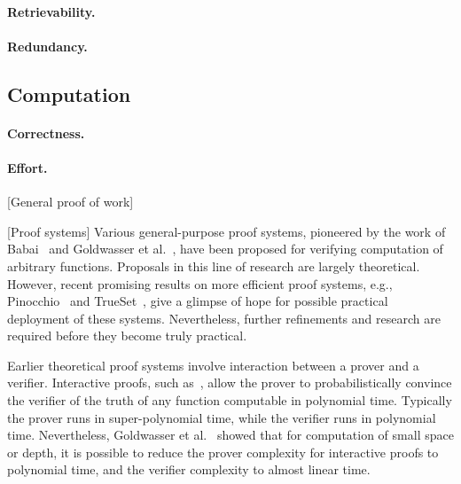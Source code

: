 \paragraph{Retrievability.}

\paragraph{Redundancy.}




\subsection{Computation}

\paragraph{Correctness.}

\paragraph{Effort.}

[General proof of work]

[Proof systems]
Various general-purpose proof systems, pioneered by the work of Babai~\cite{Bab85} and Goldwasser et al.~\cite{GMR89}, have been proposed for verifying computation of arbitrary functions.
Proposals in this line of research are largely theoretical.
However, recent promising results on more efficient proof systems, e.g., Pinocchio~\cite{PHG+13} and TrueSet~\cite{KPP+14}, give a glimpse of hope for possible practical deployment of these systems.
Nevertheless, further refinements and research are required before they become truly practical.

Earlier theoretical proof systems involve interaction between a prover and a verifier.
Interactive proofs, such as~\cite{LFK+92,Sha92}, allow the prover to probabilistically convince the verifier of the truth of any function computable in polynomial time.
Typically the prover runs in super-polynomial time, while the verifier runs in polynomial time.
Nevertheless, Goldwasser et al.~\cite{GKR08} showed that for computation of small space or depth, it is possible to reduce the prover complexity for interactive proofs to polynomial time, and the verifier complexity to almost linear time.  

